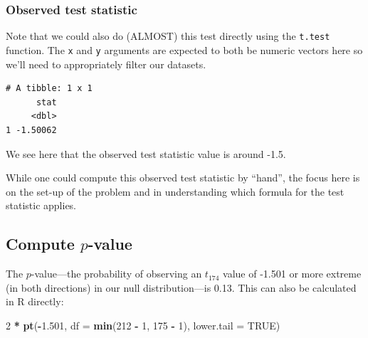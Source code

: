 \documentclass[12pt, krantz2,]{krantz}
\makeatletter
\newenvironment{Shaded}{\begin{snugshade}}{\end{snugshade}}
\newcommand{\DataTypeTok}[1]{\textcolor[rgb]{0.27,0.27,0.27}{#1}}
\newcommand{\DecValTok}[1]{\textcolor[rgb]{0.06,0.06,0.06}{#1}}
\newcommand{\FloatTok}[1]{\textcolor[rgb]{0.06,0.06,0.06}{#1}}
\newcommand{\KeywordTok}[1]{\textcolor[rgb]{0.27,0.27,0.27}{\textbf{#1}}}
\newcommand{\NormalTok}[1]{#1}
\newcommand{\OperatorTok}[1]{\textcolor[rgb]{0.43,0.43,0.43}{\textbf{#1}}}
\newcommand{\OtherTok}[1]{\textcolor[rgb]{0.37,0.37,0.37}{#1}}
\newcommand{\StringTok}[1]{\textcolor[rgb]{0.5,0.5,0.5}{#1}}
\newenvironment{kframe}{%
\medskip{}
\setlength{\fboxsep}{.8em}
 \def\at@end@of@kframe{}%
 \ifinner\ifhmode%
  \def\at@end@of@kframe{\end{minipage}}%
  \begin{minipage}{\columnwidth}%
 \fi\fi%
 \def\FrameCommand##1{\hskip\@totalleftmargin \hskip-\fboxsep
 \colorbox{shadecolor}{##1}\hskip-\fboxsep
     \hskip-\linewidth \hskip-\@totalleftmargin \hskip\columnwidth}%
 \MakeFramed {\advance\hsize-\width
   \@totalleftmargin\z@ \linewidth\hsize
   \@setminipage}}%
 {\par\unskip\endMakeFramed%
 \at@end@of@kframe}
\renewenvironment{Shaded}{\begin{kframe}}{\end{kframe}}
\makeatother
\begin{document}
\hypertarget{observed-test-statistic-3}{%
\subsubsection*{Observed test statistic}\label{observed-test-statistic-3}}


Note that we could also do (ALMOST) this test directly using the \texttt{t.test} function. The \texttt{x} and \texttt{y} arguments are expected to both be numeric vectors here so we'll need to appropriately filter our datasets.

\begin{Shaded}
\end{Shaded}

\begin{verbatim}
# A tibble: 1 x 1
      stat
     <dbl>
1 -1.50062
\end{verbatim}

We see here that the observed test statistic value is around -1.5.

While one could compute this observed test statistic by ``hand'', the focus here is on the set-up of the problem and in understanding which formula for the test statistic applies.

\hypertarget{compute-p-value-1}{%
\subsection{\texorpdfstring{Compute \(p\)-value}{Compute p-value}}\label{compute-p-value-1}}

The \(p\)-value---the probability of observing an \(t_{174}\) value of -1.501 or more extreme (in both directions) in our null distribution---is 0.13. This can also be calculated in R directly:

\begin{Shaded}
\begin{Highlighting}[]
\DecValTok{2} \OperatorTok{*}\StringTok{ }\KeywordTok{pt}\NormalTok{(}\OperatorTok{-}\FloatTok{1.501}\NormalTok{, }\DataTypeTok{df =} \KeywordTok{min}\NormalTok{(}\DecValTok{212} \OperatorTok{-}\StringTok{ }\DecValTok{1}\NormalTok{, }\DecValTok{175} \OperatorTok{-}\StringTok{ }\DecValTok{1}\NormalTok{), }\DataTypeTok{lower.tail =} \OtherTok{TRUE}\NormalTok{)}
\end{Highlighting}
\end{Shaded}
\end{document}
